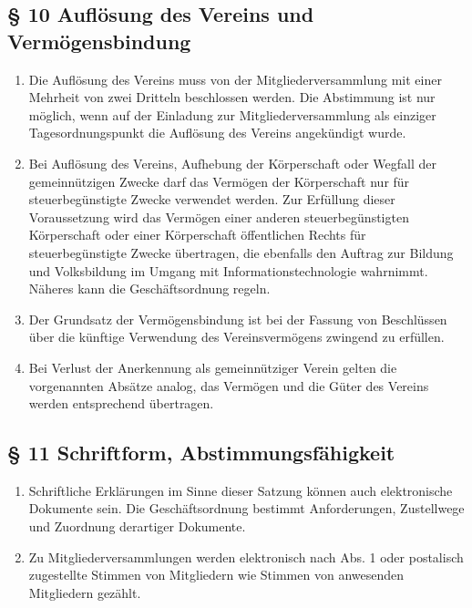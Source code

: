 ﻿\documentclass[10pt,a4paper]{scrartcl}
\begin{document}
\subsection*{§ 10 Auflösung des Vereins und Vermögensbindung}
\begin{enumerate}
        \item Die Auflösung des Vereins muss von der Mitgliederversammlung mit einer Mehrheit von
                zwei Dritteln beschlossen werden. Die Abstimmung ist nur möglich, wenn auf der Einladung
                zur Mitgliederversammlung als einziger Tagesordnungspunkt die Auflösung des Vereins
                angekündigt wurde.
        \item Bei Auflösung des Vereins, Aufhebung der Körperschaft oder Wegfall der
                gemeinnützigen Zwecke darf das Vermögen der Körperschaft nur für
                steuerbegünstigte Zwecke verwendet werden. Zur Erfüllung dieser
                Voraussetzung wird das Vermögen einer anderen steu\-er\-be\-güns\-tig\-ten
                Körperschaft oder einer Körperschaft öffentlichen Rechts für
                steuerbegünstigte Zwecke über\-tra\-gen, die ebenfalls den Auftrag
                zur Bildung und Volksbildung im Umgang mit Informationstechnologie
                wahrnimmt. Nä\-he\-res kann die Geschäftsordnung regeln.
        \item Der Grundsatz der Vermögensbindung ist bei der Fassung von
                Beschlüssen über die künf\-ti\-ge Verwendung des Vereinsvermögens zwingend
                zu erfüllen.
        \item Bei Verlust der Anerkennung als gemeinnütziger Verein gelten die vorgenannten Absätze analog, 
                das Vermögen und die Güter des Vereins werden entsprechend übertragen.
\end{enumerate}
%
%
\subsection*{§ 11 Schriftform, Abstimmungsfähigkeit}
\begin{enumerate}
        \item Schriftliche Erklärungen im Sinne dieser Satzung können auch
                elektronische Dokumente sein. Die Geschäftsordnung bestimmt
                Anforderungen, Zustellwege und Zuordnung derartiger Dokumente.
        \item Zu Mitgliederversammlungen werden elektronisch nach Abs. 1 oder
                postalisch zugestellte Stimmen von Mitgliedern wie Stimmen
                von anwesenden Mitgliedern gezählt.
\end{enumerate}
\end{document}
